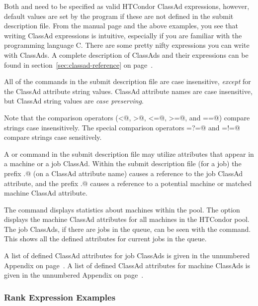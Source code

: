 Both  and  need to be specified 
as valid HTCondor ClassAd expressions, however, default values are set by the
 program if these are not defined in the submit description file.
From the  manual page and the above examples, you see
that writing ClassAd expressions is intuitive, especially if you
are familiar with the programming language C.  There are some
pretty nifty expressions you can write with ClassAds.
A complete description of ClassAds and their expressions
can be found in section~\ref{sec:classad-reference} on 
page~\pageref{sec:classad-reference}.

All of the commands in the submit description file are case insensitive, 
\emph{except} for the ClassAd attribute string values.
ClassAd attribute names are
case insensitive, but ClassAd string
values are \emph{case preserving}.

Note that the comparison operators
(\verb@<@, \verb@>@, \verb@<=@, \verb@>=@, and \verb@==@)
compare strings
case insensitively.  The special comparison operators 
\verb@=?=@ and \verb@=!=@
compare strings case sensitively.

A   or  command in
the submit description file may utilize attributes
that appear in a machine or a job ClassAd.
Within the submit description file (for a job) the
prefix \verb@MY.@ (on a ClassAd attribute name)
causes a reference to the job ClassAd attribute,
and the prefix \verb@TARGET.@ causes a reference to 
a potential machine or matched machine ClassAd attribute.

The  command displays
statistics about machines within the pool.
The  option displays the
machine ClassAd attributes for all machines in the HTCondor pool.
The job ClassAds, if there are jobs in the queue, can be seen
with the  command.
This shows all the defined attributes for current jobs in the queue.

A list of defined ClassAd attributes for job ClassAds
is given in the unnumbered Appendix on 
page~\pageref{sec:Job-ClassAd-Attributes}.
A list of defined ClassAd attributes for machine ClassAds
is given in the unnumbered Appendix on 
page~\pageref{sec:Machine-ClassAd-Attributes}.


\subsubsection{\label{rank-examples}Rank Expression Examples}

